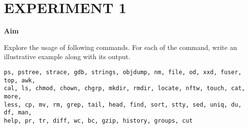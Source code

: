 \documentclass{article}
\begin{document}
\section{EXPERIMENT 1} %
\textbf{Aim}
\begin{flushleft}
Explore the usage of following commands. For each of the command, write an illustrative
example along with its output.
\end{flushleft}
\begin{verbatim}
ps, pstree, strace, gdb, strings, objdump, nm, file, od, xxd, fuser, top, awk,
cal, ls, chmod, chown, chgrp, mkdir, rmdir, locate, nftw, touch, cat, more,
less, cp, mv, rm, grep, tail, head, find, sort, stty, sed, uniq, du, df, man,
help, pr, tr, diff, wc, bc, gzip, history, groups, cut
\end{verbatim}
\end{document}
